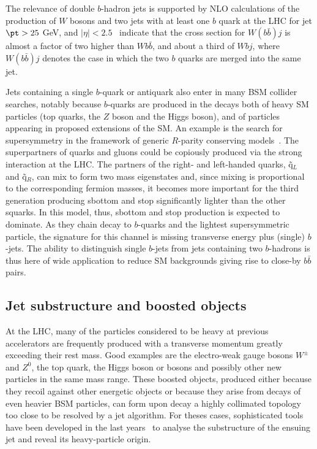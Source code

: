 The relevance of double $b$-hadron jets is supported by NLO calculations of the production of $W$ bosons and two jets with at least one $b$ quark at the LHC for jet $\pt > 25$ GeV, and $|\eta| < 2.5$~\cite{Campbell:2006} indicate that the cross section for $W(b\bar{b})j$ is almost a factor of two higher than $Wb\bar{b}$, and about a third of $Wbj$, where  $W(b\bar{b})j$ denotes the case in which the two $b$ quarks are merged into the same jet. 

Jets containing a single $b$-quark or antiquark %
also enter in many BSM collider searches, notably because $b$-quarks are produced in the decays both of heavy SM particles (top quarks, the $Z$ boson and the Higgs boson), and of particles appearing in proposed extensions of the SM.  %
 An example is the search for supersymmetry in the framework of generic $R$-parity conserving models~\cite{ATLAS-CONF-2011-098}. The superpartners of quarks and gluons could be copiously produced via the strong interaction at the LHC. The partners of the right- and left-handed quarks, \~{q}$_{L}$ and  \~{q}$_{R}$, can mix to form two mass eigenstates and, since mixing is proportional to the corresponding fermion masses, it becomes more important for the third generation producing sbottom and stop significantly lighter than the other squarks. In this model, thus, sbottom and stop production is expected to dominate. As they chain decay to $b$-quarks and the lightest supersymmetric particle, the signature for this channel is missing transverse energy %
plus (single) $b$-jets. The ability to distinguish single $b$-jets from jets containing two $b$-hadrons is thus here of wide application to reduce SM backgrounds giving rise to close-by $b\bar{b}$ pairs. %
%
\subsection{Jet substructure and boosted objects}
At the LHC, many of the particles considered to be heavy at previous accelerators are frequently produced with a transverse momentum greatly exceeding their rest mass. Good examples are the electro-weak gauge bosons $W^\pm$ and $Z^0$, the top quark, the Higgs boson or bosons and possibly other new particles in the same mass range. These boosted objects, produced either because they recoil against other energetic objects or because they arise from decays of even heavier BSM particles, can form upon decay a highly collimated topology too close to be resolved by a jet algorithm. For theses cases, sophisticated tools have been developed in the last years~\cite{jet_substruct} to analyse the substructure of the ensuing jet and reveal its heavy-particle origin.

